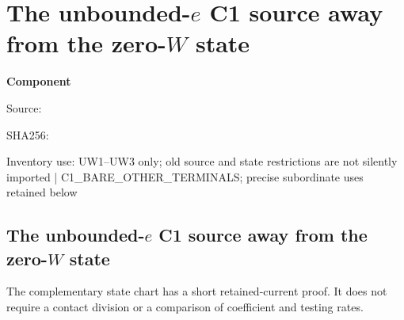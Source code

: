 \chapter{The unbounded-$e$ C1 source away from the zero-$W$ state}
\label{component:p7ef919c24082}
\noindent\textbf{Component }\par
{\small\noindent Source: \par}
{\small\noindent SHA256: \par}
{\small\noindent Inventory use: UW1–UW3 only; old source and state restrictions are not silently imported | C1\_\allowbreak{}BARE\_\allowbreak{}OTHER\_\allowbreak{}TERMINALS; precise subordinate uses retained below\par}
\medskip
\section{The unbounded-$e$ C1 source away from the zero-$W$ state}
\label{p7ef919c24082:sec:c1-unbounded-e-w-unit}

The complementary state chart has a short retained-current proof.  It
does not require a contact division or a comparison of coefficient and
testing rates.

